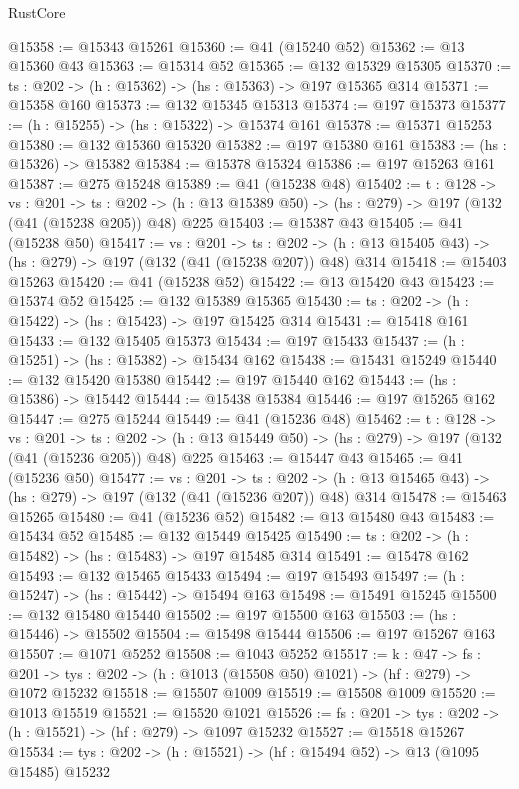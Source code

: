 \begin{lexlean}{RustCore}
\begin{coremodule}
@15358 := @15343 @15261
@15360 := @41 (@15240 @52)
@15362 := @13 @15360 @43
@15363 := @15314 @52
@15365 := @132 @15329 @15305
@15370 := {ts : @202} -> (h : @15362) -> (hs : @15363) -> @197 @15365 @314
@15371 := @15358 @160
@15373 := @132 @15345 @15313
@15374 := @197 @15373
@15377 := (h : @15255) -> (hs : @15322) -> @15374 @161
@15378 := @15371 @15253
@15380 := @132 @15360 @15320
@15382 := @197 @15380 @161
@15383 := (hs : @15326) -> @15382
@15384 := @15378 @15324
@15386 := @197 @15263 @161
@15387 := @275 @15248
@15389 := @41 (@15238 @48)
@15402 := {t : @128} ->
  {vs : @201} ->
  {ts : @202} -> (h : @13 @15389 @50) -> (hs : @279) -> @197 (@132 (@41 (@15238 @205)) @48) @225
@15403 := @15387 @43
@15405 := @41 (@15238 @50)
@15417 := {vs : @201} ->
  {ts : @202} -> (h : @13 @15405 @43) -> (hs : @279) -> @197 (@132 (@41 (@15238 @207)) @48) @314
@15418 := @15403 @15263
@15420 := @41 (@15238 @52)
@15422 := @13 @15420 @43
@15423 := @15374 @52
@15425 := @132 @15389 @15365
@15430 := {ts : @202} -> (h : @15422) -> (hs : @15423) -> @197 @15425 @314
@15431 := @15418 @161
@15433 := @132 @15405 @15373
@15434 := @197 @15433
@15437 := (h : @15251) -> (hs : @15382) -> @15434 @162
@15438 := @15431 @15249
@15440 := @132 @15420 @15380
@15442 := @197 @15440 @162
@15443 := (hs : @15386) -> @15442
@15444 := @15438 @15384
@15446 := @197 @15265 @162
@15447 := @275 @15244
@15449 := @41 (@15236 @48)
@15462 := {t : @128} ->
  {vs : @201} ->
  {ts : @202} -> (h : @13 @15449 @50) -> (hs : @279) -> @197 (@132 (@41 (@15236 @205)) @48) @225
@15463 := @15447 @43
@15465 := @41 (@15236 @50)
@15477 := {vs : @201} ->
  {ts : @202} -> (h : @13 @15465 @43) -> (hs : @279) -> @197 (@132 (@41 (@15236 @207)) @48) @314
@15478 := @15463 @15265
@15480 := @41 (@15236 @52)
@15482 := @13 @15480 @43
@15483 := @15434 @52
@15485 := @132 @15449 @15425
@15490 := {ts : @202} -> (h : @15482) -> (hs : @15483) -> @197 @15485 @314
@15491 := @15478 @162
@15493 := @132 @15465 @15433
@15494 := @197 @15493
@15497 := (h : @15247) -> (hs : @15442) -> @15494 @163
@15498 := @15491 @15245
@15500 := @132 @15480 @15440
@15502 := @197 @15500 @163
@15503 := (hs : @15446) -> @15502
@15504 := @15498 @15444
@15506 := @197 @15267 @163
@15507 := @1071 @5252
@15508 := @1043 @5252
@15517 := {k : @47} ->
  {fs : @201} -> {tys : @202} -> (h : @1013 (@15508 @50) @1021) -> (hf : @279) -> @1072 @15232
@15518 := @15507 @1009
@15519 := @15508 @1009
@15520 := @1013 @15519
@15521 := @15520 @1021
@15526 := {fs : @201} -> {tys : @202} -> (h : @15521) -> (hf : @279) -> @1097 @15232
@15527 := @15518 @15267
@15534 := {tys : @202} -> (h : @15521) -> (hf : @15494 @52) -> @13 (@1095 @15485) @15232

\end{coremodule}
\end{lexlean}

